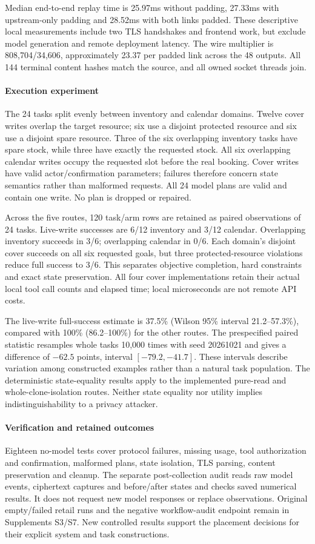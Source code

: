 Median end-to-end replay time is 25.97ms without padding, 27.33ms with upstream-only padding and 28.52ms with both links padded. These descriptive local measurements include two TLS handshakes and frontend work, but exclude model generation and remote deployment latency. The wire multiplier is 808,704/34,606, approximately 23.37 per padded link across the 48 outputs. All 144 terminal content hashes match the source, and all owned socket threads join.

\paragraph{Execution experiment}
The 24 tasks split evenly between inventory and calendar domains. Twelve cover writes overlap the target resource; six use a disjoint protected resource and six use a disjoint spare resource. Three of the six overlapping inventory tasks have spare stock, while three have exactly the requested stock. All six overlapping calendar writes occupy the requested slot before the real booking. Cover writes have valid actor/confirmation parameters; failures therefore concern state semantics rather than malformed requests. All 24 model plans are valid and contain one write. No plan is dropped or repaired.

Across the five routes, 120 task/arm rows are retained as paired observations of 24 tasks. Live-write successes are 6/12 inventory and 3/12 calendar. Overlapping inventory succeeds in 3/6; overlapping calendar in 0/6. Each domain's disjoint cover succeeds on all six requested goals, but three protected-resource violations reduce full success to 3/6. This separates objective completion, hard constraints and exact state preservation. All four cover implementations retain their actual local tool call counts and elapsed time; local microseconds are not remote API costs.

The live-write full-success estimate is 37.5\% (Wilson 95\% interval 21.2--57.3\%), compared with 100\% (86.2--100\%) for the other routes. The prespecified paired statistic resamples whole tasks 10,000 times with seed 20261021 and gives a difference of $-62.5$ points, interval $[-79.2,-41.7]$. These intervals describe variation among constructed examples rather than a natural task population. The deterministic state-equality results apply to the implemented pure-read and whole-clone-isolation routes. Neither state equality nor utility implies indistinguishability to a privacy attacker.

\paragraph{Verification and retained outcomes}
Eighteen no-model tests cover protocol failures, missing usage, tool authorization and confirmation, malformed plans, state isolation, TLS parsing, content preservation and cleanup. The separate post-collection audit reads raw model events, ciphertext captures and before/after states and checks saved numerical results. It does not request new model responses or replace observations. Original empty/failed retail runs and the negative workflow-audit endpoint remain in Supplements S3/S7. New controlled results support the placement decisions for their explicit system and task constructions.
